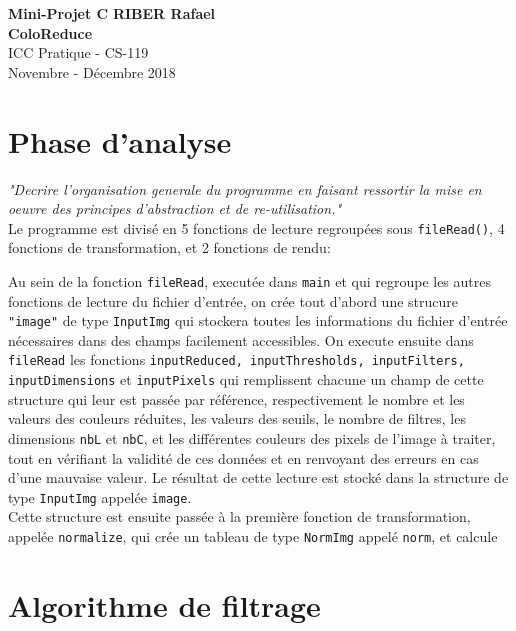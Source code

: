 \documentclass[a4paper, 11pt]{article}
\begin{document}
\noindent
\large\textbf{Mini-Projet C\raisebox{.5\height}{\scalebox{.5}{++}}} \hfill \textbf{RIBER Rafael} \\
\large\textbf{ColoReduce}\\
\normalsize ICC Pratique - CS-119\\
\hfill Novembre - Décembre 2018

\section*{Phase d'analyse}
\textit{"Decrire l’organisation generale du programme en faisant ressortir la mise en oeuvre des principes d’abstraction et de re-utilisation."}\\

Le programme est divisé en 5 fonctions de lecture regroupées sous \texttt{fileRead()}, 4 fonctions de transformation, et 2 fonctions de rendu:

Au sein de la fonction \texttt{fileRead}, executée dans \texttt{main} et qui regroupe les autres fonctions de lecture du fichier d'entrée, on crée tout d'abord une strucure \texttt{"image"} de type \texttt{InputImg} qui stockera toutes les informations du fichier d'entrée nécessaires dans des champs facilement accessibles. 
On execute ensuite dans \texttt{fileRead} les fonctions \texttt{inputReduced, inputThresholds, inputFilters, inputDimensions} et \texttt{inputPixels} qui remplissent chacune un champ de cette structure qui leur est passée par référence, respectivement le nombre et les valeurs des couleurs réduites, les valeurs des seuils, le nombre de filtres, les dimensions \texttt{nbL} et \texttt{nbC}, et les différentes couleurs des pixels de l'image à traiter, tout en vérifiant la validité de ces données et en renvoyant des erreurs en cas d'une mauvaise valeur. Le résultat de cette lecture est stocké dans la structure de type \texttt{InputImg} appelée \texttt{image}.\\

Cette structure est ensuite passée à la première fonction de transformation, appelée \texttt{normalize}, qui crée un tableau de type \texttt{NormImg} appelé \texttt{norm}, et calcule 

\newpage
\section*{Algorithme de filtrage}
\end{document}
